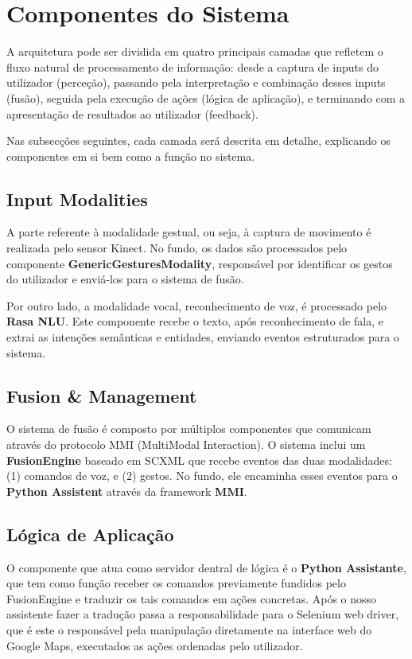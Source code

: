 \documentclass{report}
\begin{document}
\section{Componentes do Sistema}

A arquitetura pode ser dividida em quatro principais camadas que refletem o fluxo natural de processamento de informação: desde a captura de inputs do utilizador (perceção), passando pela interpretação e combinação desses inputs (fusão), seguida pela execução de ações (lógica de aplicação), e terminando com a apresentação de resultados ao utilizador (feedback). 

Nas subsecções seguintes, cada camada será descrita em detalhe, explicando os componentes em si bem como a função no sistema.

\subsection{Input Modalities}

A parte referente à modalidade gestual, ou seja, à captura de movimento é realizada pelo sensor Kinect. No fundo, os dados são processados pelo componente \textbf{GenericGesturesModality}, responsável por identificar os gestos do utilizador e enviá-los para o sistema de fusão.  

Por outro lado, a modalidade vocal, reconhecimento de voz, é processado pelo \textbf{Rasa NLU}. Este componente recebe o texto, após reconhecimento de fala, e extrai as intenções semânticas e entidades, enviando eventos estruturados para o sistema.


\subsection{Fusion \& Management}

O sistema de fusão é composto  por múltiplos componentes que comunicam através do protocolo MMI (MultiModal Interaction). O sistema inclui um \textbf{FusionEngine} baseado em SCXML que recebe eventos das duas modalidades: (1) comandos de voz, e (2) gestos. No fundo, ele encaminha esses eventos para o \textbf{Python Assistent} através da framework \textbf{MMI}.  


\subsection{Lógica de Aplicação}

O componente que atua como servidor dentral de lógica é o \textbf{Python Assistante}, que tem como função receber os comandos previamente fundidos pelo FusionEngine e traduzir os tais comandos em ações concretas. Após o nosso assistente fazer a tradução passa a responsabilidade para o Selenium web driver, que é este o responsável pela manipulação diretamente na interface web do Google Maps, executados as ações ordenadas pelo utilizador. 
\end{document}
